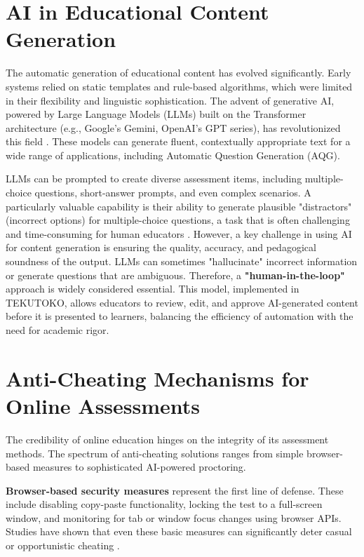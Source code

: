 \section{AI in Educational Content Generation}
\label{sec:lit-ai}
The automatic generation of educational content has evolved significantly. Early systems relied on static templates and rule-based algorithms, which were limited in their flexibility and linguistic sophistication. The advent of generative AI, powered by Large Language Models (LLMs) built on the Transformer architecture (e.g., Google's Gemini, OpenAI's GPT series), has revolutionized this field \citep{brown2020}. These models can generate fluent, contextually appropriate text for a wide range of applications, including Automatic Question Generation (AQG).

LLMs can be prompted to create diverse assessment items, including multiple-choice questions, short-answer prompts, and even complex scenarios. A particularly valuable capability is their ability to generate plausible "distractors" (incorrect options) for multiple-choice questions, a task that is often challenging and time-consuming for human educators \citep{gierl2013}. However, a key challenge in using AI for content generation is ensuring the quality, accuracy, and pedagogical soundness of the output. LLMs can sometimes "hallucinate" incorrect information or generate questions that are ambiguous. Therefore, a \textbf{"human-in-the-loop"} approach is widely considered essential. This model, implemented in TEKUTOKO, allows educators to review, edit, and approve AI-generated content before it is presented to learners, balancing the efficiency of automation with the need for academic rigor.

\section{Anti-Cheating Mechanisms for Online Assessments}
\label{sec:lit-proctoring}
The credibility of online education hinges on the integrity of its assessment methods. The spectrum of anti-cheating solutions ranges from simple browser-based measures to sophisticated AI-powered proctoring.

\textbf{Browser-based security measures} represent the first line of defense. These include disabling copy-paste functionality, locking the test to a full-screen window, and monitoring for tab or window focus changes using browser APIs. Studies have shown that even these basic measures can significantly deter casual or opportunistic cheating \citep{atterton2007}.

